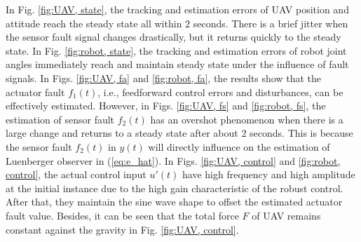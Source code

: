 \documentclass{ieeeaccess}
\begin{document}
In Fig. \ref{fig:UAV, state}, the tracking and estimation errors of UAV position and attitude reach the steady state all within $2$ seconds. There is a brief jitter when the sensor fault signal changes drastically, but it returns quickly to the steady state. In Fig. \ref{fig:robot, state}, the tracking and estimation errors of robot joint angles immediately reach and maintain steady state under the influence of fault signals. In Figs. \ref{fig:UAV, fa} and \ref{fig:robot, fa}, the results show that the actuator fault $f_1(t)$, i.e., feedforward control errors and disturbances, can be effectively estimated. However, in Figs. \ref{fig:UAV, fs} and \ref{fig:robot, fs}, the estimation of sensor fault $f_2(t)$ has an overshot phenomenon when there is a large change and returns to a steady state after about $2$ seconds. This is because the sensor fault $f_2(t)$ in $y(t)$ will directly influence on the estimation of Luenberger observer in (\ref{eq:e_hat}). In Figs. \ref{fig:UAV, control} and \ref{fig:robot, control}, the actual control input $u'(t)$ have high frequency and high amplitude at the initial instance due to the high gain characteristic of the robust control. After that, they maintain the sine wave shape to offset the estimated actuator fault value. Besides, it can be seen that the total force $F$ of UAV remains constant against the gravity in Fig. \ref{fig:UAV, control}.
\end{document}
